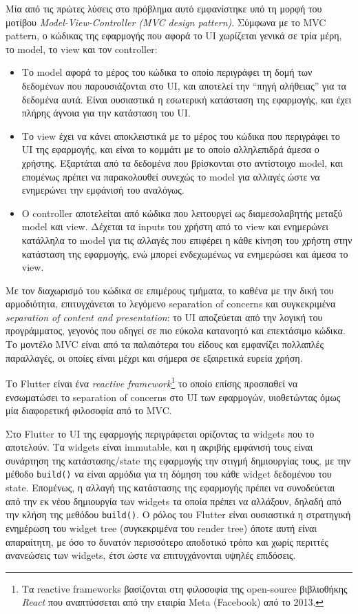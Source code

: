 \documentclass[../thesis.tex]{subfiles}
\begin{document}
\bigskip

Μία από τις πρώτες λύσεις στο πρόβλημα αυτό εμφανίστηκε υπό τη μορφή του μοτίβου \textit{Model-View-Controller (MVC design pattern)}.
Σύμφωνα με το MVC pattern, ο κώδικας της εφαρμογής που αφορά το UI χωρίζεται γενικά σε τρία μέρη, το model, το view και τον controller\cite{mvc_mdn}:
\begin{itemize}
    \item Το model αφορά το μέρος του κώδικα το οποίο περιγράφει τη δομή των δεδομένων που παρουσιάζονται στο UI, και αποτελεί την ``πηγή αλήθειας'' για τα δεδομένα αυτά. Είναι ουσιαστικά η εσωτερική κατάσταση της εφαρμογής, και έχει πλήρης άγνοια για την κατάσταση του UI.
    \item Το view έχει να κάνει αποκλειστικά με το μέρος του κώδικα που περιγράφει το UI της εφαρμογής, και είναι το κομμάτι με το οποίο αλληλεπιδρά άμεσα ο χρήστης. Εξαρτάται από τα δεδομένα που βρίσκονται στο αντίστοιχο model, και επομένως πρέπει να παρακολουθεί συνεχώς το model για αλλαγές ώστε να ενημερώνει την εμφάνισή του αναλόγως.
    \item Ο controller αποτελείται από κώδικα που λειτουργεί ως διαμεσολαβητής μεταξύ model και view. Δέχεται τα inputs του χρήστη από το view και ενημερώνει κατάλληλα το model για τις αλλαγές που επιφέρει η κάθε κίνηση του χρήστη στην κατάσταση της εφαρμογής, ενώ μπορεί ενδεχωμένως να ενημερώσει και άμεσα το view.
\end{itemize}
Με τον διαχωρισμό του κώδικα σε επιμέρους τμήματα, το καθένα με την δική του αρμοδιότητα, επιτυγχάνεται το λεγόμενο separation of concerns και συγκεκριμένα \textit{separation of content and presentation}\cite{mvc_fowler}: το UI αποζεύεται από την λογική του προγράμματος, γεγονός που οδηγεί σε πιο εύκολα κατανοητό και επεκτάσιμο κώδικα.
Το μοντέλο MVC είναι από τα παλαιότερα του είδους και εμφανίζει πολλαπλές παραλλαγές, οι οποίες είναι μέχρι και σήμερα σε εξαιρετικά ευρεία χρήση.

\bigskip

Το Flutter είναι ένα \textit{reactive framework}\footnote{Τα reactive frameworks βασίζονται στη φιλοσοφία της open-source βιβλιοθήκης \textit{React} που αναπτύσσεται από την εταιρία Meta (Facebook) από το 2013.} το οποίο επίσης προσπαθεί να ενσωματώσει το separation of concerns στο UI των εφαρμογών, υιοθετώντας όμως μία διαφορετική φιλοσοφία από το MVC.

Στο Flutter το UI της εφαρμογής περιγράφεται ορίζοντας τα widgets που το αποτελούν.
Τα widgets είναι immutable, και η ακριβής εμφάνισή τους είναι συνάρτηση της κατάστασης/state της εφαρμογής την στιγμή δημιουργίας τους, με την μέθοδο \texttt{build()} να είναι αρμόδια για τη δόμηση του κάθε widget δεδομένου του state. 
Επομένως, η αλλαγή της κατάστασης της εφαρμογής πρέπει να συνοδεύεται από την εκ νέου δημιουργία των widgets τα οποία πρέπει να αλλάξουν, δηλαδή από την κλήση της μεθόδου \texttt{build()}.
Ο ρόλος του Flutter είναι ουσιαστικά η στρατηγική ενημέρωση του widget tree (συγκεκριμένα του render tree) όποτε αυτή είναι απαραίτητη, με όσο το δυνατόν περισσότερο αποδοτικό τρόπο και χωρίς περιττές ανανεώσεις των widgets, έτσι ώστε να επιτυγχάνονται υψηλές επιδόσεις.
\end{document}
